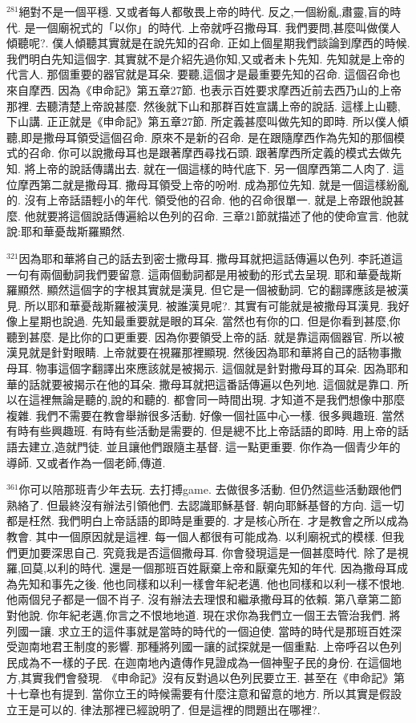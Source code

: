 \documentclass{book}
\begin{document}
$^{281}$絕對不是一個平穩.
又或者每人都敬畏上帝的時代.
反之,一個紛亂,肅靈,盲的時代.
是一個廟祝式的「以你」的時代.
上帝就呼召撒母耳.
我們要問,甚麼叫做僕人傾聽呢?.
僕人傾聽其實就是在說先知的召命.
正如上個星期我們談論到摩西的時候.
我們明白先知這個字.
其實就不是介紹先過你知,又或者未卜先知.
先知就是上帝的代言人.
那個重要的器官就是耳朵.
要聽,這個才是最重要先知的召命.
這個召命也來自摩西.
因為《申命記》第五章27節.
也表示百姓要求摩西近前去西乃山的上帝那裡.
去聽清楚上帝說甚麼.
然後就下山和那群百姓宣講上帝的說話.
這樣上山聽,下山講.
正正就是《申命記》第五章27節.
所定義甚麼叫做先知的即時.
所以僕人傾聽,即是撒母耳領受這個召命.
原來不是新的召命.
是在跟隨摩西作為先知的那個模式的召命.
你可以說撒母耳也是跟著摩西尋找石頭.
跟著摩西所定義的模式去做先知.
將上帝的說話傳講出去.
就在一個這樣的時代底下.
另一個摩西第二人肉了.
這位摩西第二就是撒母耳.
撒母耳領受上帝的吩咐.
成為那位先知.
就是一個這樣紛亂的.
沒有上帝話語輕小的年代.
領受他的召命.
他的召命很單一.
就是上帝跟他說甚麼.
他就要將這個說話傳遍給以色列的召命.
三章21節就描述了他的使命宣言.
他就說:耶和華憂哉斯羅顯然.

$^{321}$因為耶和華將自己的話去到密士撒母耳.
撒母耳就把這話傳遍以色列.
李託道這一句有兩個動詞我們要留意.
這兩個動詞都是用被動的形式去呈現.
耶和華憂哉斯羅顯然.
顯然這個字的字根其實就是漢見.
但它是一個被動詞.
它的翻譯應該是被漢見.
所以耶和華憂哉斯羅被漢見.
被誰漢見呢?.
其實有可能就是被撒母耳漢見.
我好像上星期也說過.
先知最重要就是眼的耳朵.
當然也有你的口.
但是你看到甚麼,你聽到甚麼.
是比你的口更重要.
因為你要領受上帝的話.
就是靠這兩個器官.
所以被漢見就是針對眼睛.
上帝就要在視羅那裡顯現.
然後因為耶和華將自己的話物事撒母耳.
物事這個字翻譯出來應該就是被揭示.
這個就是針對撒母耳的耳朵.
因為耶和華的話就要被揭示在他的耳朵.
撒母耳就把這番話傳遍以色列地.
這個就是靠口.
所以在這裡無論是聽的,說的和聽的.
都會同一時間出現.
才知道不是我們想像中那麼複雜.
我們不需要在教會舉辦很多活動.
好像一個社區中心一樣.
很多興趣班.
當然有時有些興趣班.
有時有些活動是需要的.
但是總不比上帝話語的即時.
用上帝的話語去建立,造就門徒.
並且讓他們跟隨主基督.
這一點更重要.
你作為一個青少年的導師.
又或者作為一個老師,傳道.

$^{361}$你可以陪那班青少年去玩.
去打搏game.
去做很多活動.
但仍然這些活動跟他們熟絡了.
但最終沒有辦法引領他們.
去認識耶穌基督.
朝向耶穌基督的方向.
這一切都是枉然.
我們明白上帝話語的即時是重要的.
才是核心所在.
才是教會之所以成為教會.
其中一個原因就是這裡.
每一個人都很有可能成為.
以利廟祝式的模樣.
但我們更加要深思自己.
究竟我是否這個撒母耳.
你會發現這是一個甚麼時代.
除了是視羅,回莫,以利的時代.
還是一個那班百姓厭棄上帝和厭棄先知的年代.
因為撒母耳成為先知和事先之後.
他也同樣和以利一樣會年紀老邁.
他也同樣和以利一樣不恨地.
他兩個兒子都是一個不肖子.
沒有辦法去理恨和繼承撒母耳的依賴.
第八章第二節對他說.
你年紀老邁,你言之不恨地地道.
現在求你為我們立一個王去管治我們.
將列國一讓.
求立王的這件事就是當時的時代的一個迫使.
當時的時代是那班百姓深受迦南地君王制度的影響.
那種將列國一讓的試探就是一個重點.
上帝呼召以色列民成為不一樣的子民.
在迦南地內遺傳作見證成為一個神聖子民的身份.
在這個地方,其實我們會發現.
《申命記》沒有反對過以色列民要立王.
甚至在《申命記》第十七章也有提到.
當你立王的時候需要有什麼注意和留意的地方.
所以其實是假設立王是可以的.
律法那裡已經說明了.
但是這裡的問題出在哪裡?.
\end{document}
